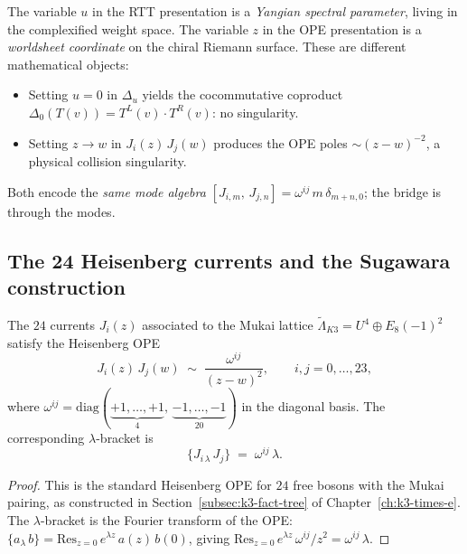 \begin{remark}
\label{rem:spectral-vs-worldsheet}
The variable $u$ in the RTT presentation is a \emph{Yangian spectral parameter}, living in the complexified weight space. The variable $z$ in the OPE presentation is a \emph{worldsheet coordinate} on the chiral Riemann surface. These are different mathematical objects:
\begin{itemize}
 \item Setting $u = 0$ in $\Delta_u$ yields the cocommutative coproduct $\Delta_0(T(v)) = T^L(v) \cdot T^R(v)$: no singularity.
 \item Setting $z \to w$ in $J_i(z)\,J_j(w)$ produces the OPE poles $\sim (z-w)^{-2}$, a physical collision singularity.
\end{itemize}
Both encode the \emph{same mode algebra} $[J_{i,m},\, J_{j,n}] = \omega^{ij}\, m\, \delta_{m+n,0}$; the bridge is through the modes.
\end{remark}

\subsection{The 24 Heisenberg currents and the Sugawara construction}
\label{subsec:k3-heisenberg-ope}

\begin{proposition}
\label{prop:mukai-heisenberg-ope}
The $24$ currents $J_i(z)$ associated to the Mukai lattice $\widetilde{\Lambda}_{K3} = U^4 \oplus E_8(-1)^2$ satisfy the Heisenberg OPE
\begin{equation}\label{eq:mukai-heisenberg-ope}
 J_i(z)\, J_j(w) \;\sim\; \frac{\omega^{ij}}{(z - w)^2},
 \qquad i, j = 0, \ldots, 23,
\end{equation}
where $\omega^{ij} = \mathrm{diag}(\underbrace{+1, \ldots, +1}_{4},\, \underbrace{-1, \ldots, -1}_{20})$ in the diagonal basis. The corresponding $\lambda$-bracket is
\begin{equation}\label{eq:mukai-lambda-bracket}
 \{J_{i\,\lambda}\, J_j\} \;=\; \omega^{ij}\, \lambda.
\end{equation}
\end{proposition}

\begin{proof}
This is the standard Heisenberg OPE for $24$ free bosons with the Mukai pairing, as constructed in Section~\ref{subsec:k3-fact-tree} of Chapter~\ref{ch:k3-times-e}. The $\lambda$-bracket is the Fourier transform of the OPE: $\{a_\lambda\, b\} = \mathrm{Res}_{z=0}\, e^{\lambda z}\, a(z)\, b(0)$, giving $\mathrm{Res}_{z=0}\, e^{\lambda z}\, \omega^{ij}/z^2 = \omega^{ij}\, \lambda$.
\end{proof}


